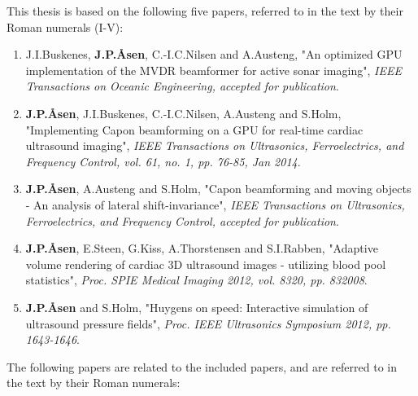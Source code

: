 \documentclass[10pt,b5paper,twoside]{book}
\begin{document}
This thesis is based on the following five papers, referred to in the text by their Roman numerals (I-V): 
\begin{enumerate}[I]
\renewcommand\labelenumi{\bfseries\theenumi}
	\item J.\:I.\:Buskenes, \textbf{J.\:P.\:\AA{}sen}, C.-I.\:C.\:Nilsen and A.\:Austeng, "An optimized GPU implementation of the MVDR beamformer for active sonar imaging", {\it  IEEE Transactions on Oceanic Engineering, accepted for publication}.
	\item \textbf{J.\:P.\:\AA{}sen}, J.\:I.\:Buskenes, C.-I.\:C.\:Nilsen, A.\:Austeng and S.\:Holm, "Implementing Capon beamforming on a GPU for real-time cardiac ultrasound imaging", {\it IEEE Transactions on Ultrasonics, Ferroelectrics, and Frequency Control, vol. 61, no. 1, pp. 76-85, Jan 2014}.
 	\item \textbf{J.\:P.\:\AA{}sen}, A.\:Austeng and S.\:Holm, "Capon beamforming and moving objects - An analysis of lateral shift-invariance", {\it IEEE Transactions on Ultrasonics, Ferroelectrics, and Frequency Control, accepted for publication}.
	\item \textbf{J.\:P.\:\AA{}sen}, E.\:Steen, G.\:Kiss, A.\:Thorstensen and S.\:I.\:Rabben, "Adaptive volume rendering of cardiac 3D ultrasound images - utilizing blood pool statistics", {\it Proc. SPIE Medical Imaging 2012, vol. 8320, pp. 832008}.
	\item \textbf{J.\:P.\:\AA{}sen} and S.\:Holm, "Huygens on speed: Interactive simulation of ultrasound pressure fields", {\it Proc. IEEE Ultrasonics Symposium 2012, pp. 1643-1646}.
\end{enumerate}  

The following papers are related to the included papers, and are referred to in the text by their Roman numerals: 
\end{document}
